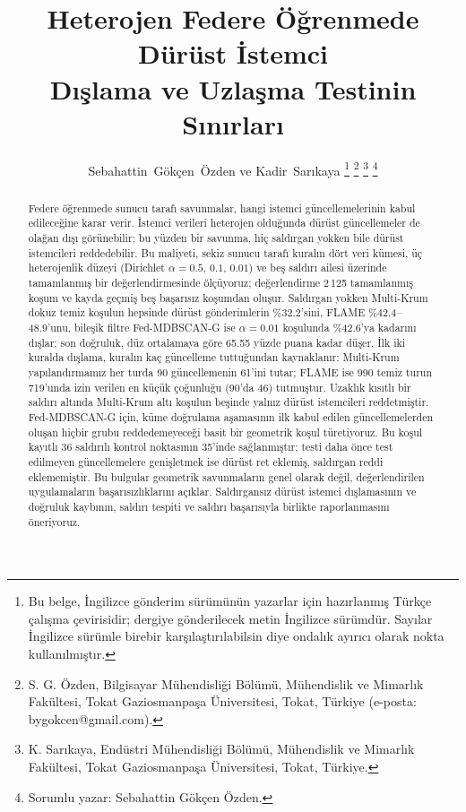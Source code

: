 \documentclass[journal]{IEEEtran}
\begin{document}
\title{Heterojen Federe Öğrenmede Dürüst İstemci\\Dışlama ve Uzlaşma Testinin Sınırları}

\author{Sebahattin~Gökçen~Özden ve Kadir~Sarıkaya%
\thanks{Bu belge, İngilizce gönderim sürümünün yazarlar için hazırlanmış Türkçe çalışma çevirisidir; dergiye gönderilecek metin İngilizce sürümdür. Sayılar İngilizce sürümle birebir karşılaştırılabilsin diye ondalık ayırıcı olarak nokta kullanılmıştır.}%
\thanks{S. G. Özden, Bilgisayar Mühendisliği Bölümü, Mühendislik ve Mimarlık Fakültesi, Tokat Gaziosmanpaşa Üniversitesi, Tokat, Türkiye (e-posta: bygokcen@gmail.com).}%
\thanks{K. Sarıkaya, Endüstri Mühendisliği Bölümü, Mühendislik ve Mimarlık Fakültesi, Tokat Gaziosmanpaşa Üniversitesi, Tokat, Türkiye.}%
\thanks{Sorumlu yazar: Sebahattin Gökçen Özden.}}

\maketitle

\begin{abstract}
Federe öğrenmede sunucu tarafı savunmalar, hangi istemci güncellemelerinin kabul edileceğine karar verir. İstemci verileri heterojen olduğunda dürüst güncellemeler de olağan dışı görünebilir; bu yüzden bir savunma, hiç saldırgan yokken bile dürüst istemcileri reddedebilir. Bu maliyeti, sekiz sunucu tarafı kuralın dört veri kümesi, üç heterojenlik düzeyi (Dirichlet $\alpha=0.5$, $0.1$, $0.01$) ve beş saldırı ailesi üzerinde tamamlanmış bir değerlendirmesinde ölçüyoruz; değerlendirme 2\,125 tamamlanmış koşum ve kayda geçmiş beş başarısız koşumdan oluşur. Saldırgan yokken Multi-Krum dokuz temiz koşulun hepsinde dürüst gönderimlerin \%32.2'sini, FLAME \%42.4--48.9'unu, bileşik filtre Fed-MDBSCAN-G ise $\alpha=0.01$ koşulunda \%42.6'ya kadarını dışlar; son doğruluk, düz ortalamaya göre 65.55 yüzde puana kadar düşer. İlk iki kuralda dışlama, kuralın kaç güncelleme tuttuğundan kaynaklanır: Multi-Krum yapılandırmamız her turda 90 güncellemenin 61'ini tutar; FLAME ise 990 temiz turun 719'unda izin verilen en küçük çoğunluğu (90'da 46) tutmuştur. Uzaklık kısıtlı bir saldırı altında Multi-Krum altı koşulun beşinde yalnız dürüst istemcileri reddetmiştir. Fed-MDBSCAN-G için, küme doğrulama aşamasının ilk kabul edilen güncellemelerden oluşan hiçbir grubu reddedemeyeceği basit bir geometrik koşul türetiyoruz. Bu koşul kayıtlı 36 saldırılı kontrol noktasının 35'inde sağlanmıştır; testi daha önce test edilmeyen güncellemelere genişletmek ise dürüst ret eklemiş, saldırgan reddi eklememiştir. Bu bulgular geometrik savunmaların genel olarak değil, değerlendirilen uygulamaların başarısızlıklarını açıklar. Saldırgansız dürüst istemci dışlamasının ve doğruluk kaybının, saldırı tespiti ve saldırı başarısıyla birlikte raporlanmasını öneriyoruz.
\end{abstract}
\end{document}
